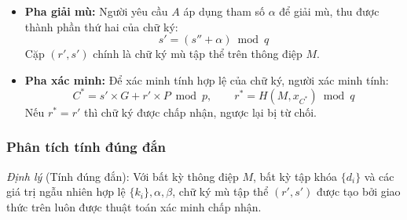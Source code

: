 \begin{itemize}
    \item \textbf{Pha giải mù:} Người yêu cầu $A$ áp dụng tham số $\alpha$ để giải mù, thu được thành phần thứ hai của chữ ký:
    \begin{equation}
        s' = (s'' + \alpha) \bmod q
        \label{eq:bms-unblind}
    \end{equation}
    Cặp $(r', s')$ chính là chữ ký mù tập thể trên thông điệp $M$.

    \item \textbf{Pha xác minh:} Để xác minh tính hợp lệ của chữ ký, người xác minh tính:
    \begin{equation}
        C^* = s' \times G + r' \times P \bmod p, \qquad r^* = H(M, x_{C^*}) \bmod q
        \label{eq:bms-verify}
    \end{equation}
    Nếu $r^* = r'$ thì chữ ký được chấp nhận, ngược lại bị từ chối.
\end{itemize}

\subsubsection{Phân tích tính đúng đắn}

\textit{Định lý} (Tính đúng đắn): Với bất kỳ thông điệp $M$, bất kỳ tập khóa $\{d_i\}$ và các giá trị ngẫu nhiên hợp lệ $\{k_i\}, \alpha, \beta$, chữ ký mù tập thể $(r', s')$ được tạo bởi giao thức trên luôn được thuật toán xác minh chấp nhận.

